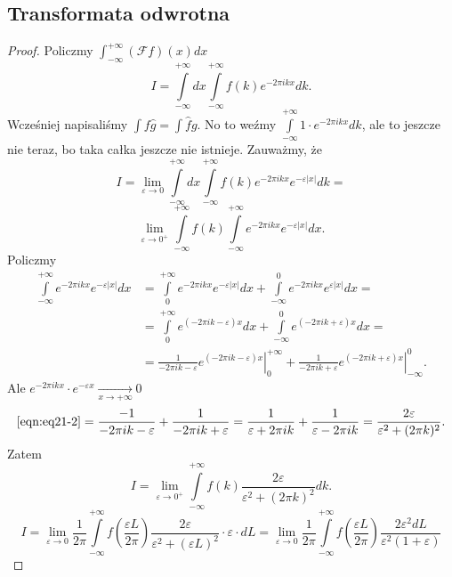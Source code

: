 \documentclass[../main.tex]{subfiles}
\begin{document}
\subsection{Transformata odwrotna}
\begin{proof}

    Policzmy $\int_{-\infty}^{+\infty}\left( \mathcal{F}f \right) (x)dx$
        \[
            I = \int\limits_{-\infty}^{+\infty}dx\int\limits_{-\infty}^{+\infty}f(k)e^{-2\pi i k x}dk
        .\]
    Wcześniej napisaliśmy $\int f \hat{g} = \int \hat{f} g$. No to weźmy $\int\limits_{-\infty}^{+\infty} 1 \cdot e^{-2\pi i kx}dk$, ale to jeszcze nie teraz, bo taka całka jeszcze nie istnieje. Zauważmy, że
        \[
            I = \lim_{\varepsilon \to 0}\int\limits_{-\infty}^{+\infty}dx \int\limits_{-\infty}^{+\infty}f(k)e^{-2\pi i k x}e^{-\varepsilon|x|}dk =
        \]
    \[
        \lim_{\varepsilon \to 0^+} \int\limits_{-\infty}^{+\infty}f(k)\int\limits_{-\infty}^{+\infty}e^{-2\pi i kx}e^{-\varepsilon|x|}dx
    .\]
Policzmy
\begin{align*}
    \int\limits_{-\infty}^{+\infty}e^{-2\pi i kx}e^{-\varepsilon|x|}dx &= \int\limits_{0}^{+\infty}e^{-2\pi i kx}e^{-\varepsilon|x|}dx + \int\limits_{-\infty}^{0}e^{-2\pi i kx}e^{\varepsilon|x|}dx =\\
    &=
    \label{eqn:eq21-2}
    \int\limits_{0}^{+\infty}e^{(-2\pi i k - \varepsilon)x}dx + \int\limits_{-\infty}^{0}e^{(-2\pi ik + \varepsilon)x}dx =\\
    &= \frac{1}{-2\pi i k -\varepsilon}\left.e^{(-2\pi i k - \varepsilon)x}\right|_{0}^{+\infty} + \frac{1}{-2\pi i k + \varepsilon}\left.e^{(-2\pi ik + \varepsilon)x}\right|_{-\infty}^0 \tag{$\star\star$}
.\end{align*}
Ale $e^{-2\pi i kx} \cdot e^{-\varepsilon x}\underset{x\to +\infty}{\longrightarrow} 0$
\[
    \eqref{eqn:eq21-2} = \frac{-1}{-2\pi i k - \varepsilon} + \frac{1}{-2 \pi i k + \varepsilon} = \frac{1}{\varepsilon + 2 \pi i k} + \frac{1}{\varepsilon - 2\pi i k} = \frac{2 \varepsilon}{\varepsilon^2 + (2\pi k)^2}
.\]
Zatem
\[
    I = \lim_{\varepsilon \to 0^+} \int\limits_{-\infty}^{+\infty}f(k) \frac{2\varepsilon}{\varepsilon^2 + (2\pi k)^2}dk
.\]
\[
    I = \lim_{\varepsilon \to 0} \frac{1}{2\pi}\int\limits_{-\infty}^{+\infty}f\left( \frac{\varepsilon L}{2\pi} \right) \frac{2 \varepsilon}{\varepsilon^2 + (\varepsilon L)^2} \cdot \varepsilon \cdot dL = \lim_{\varepsilon \to 0}\frac{1}{2\pi}\int\limits_{-\infty}^{+\infty}f\left( \frac{\varepsilon L}{2\pi} \right) \frac{2 \varepsilon^2 dL}{\varepsilon^2(1+\varepsilon)}
\]
\end{proof}
\end{document}
